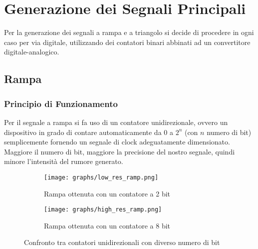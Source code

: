 \chapter{Generazione dei Segnali Principali}


Per la generazione dei segnali a rampa e a triangolo si decide di procedere in ogni caso
per via digitale, utilizzando dei contatori binari abbinati ad un convertitore
digitale-analogico.


\section{Rampa}


\subsection*{Principio di Funzionamento}


Per il segnale a rampa si fa uso di un contatore unidirezionale, ovvero un dispositivo
in grado di contare automaticamente da $0$ a $2^n$ (con $n$ numero di bit) semplicemente
fornendo un segnale di clock adeguatamente dimensionato. Maggiore il numero di bit,
maggiore la precisione del nostro segnale, quindi minore l'intensità del rumore generato.

\begin{figure}[H]
    \centering

    \begin{subfigure}{.5\textwidth}
        \centering
        \texttt{[image: graphs/low\_res\_ramp.png]}
        \caption{Rampa ottenuta con un contatore a 2 bit}
        \label{low_res_ramp}
    \end{subfigure}%
    \begin{subfigure}{.5\textwidth}
        \centering
        \texttt{[image: graphs/high\_res\_ramp.png]}
        \caption{Rampa ottenuta con un contatore a 8 bit}
        \label{high_res_ramp}
    \end{subfigure}

    \caption{Confronto tra contatori unidirezionali con diverso numero di bit}
    \label{ramps}
\end{figure}

